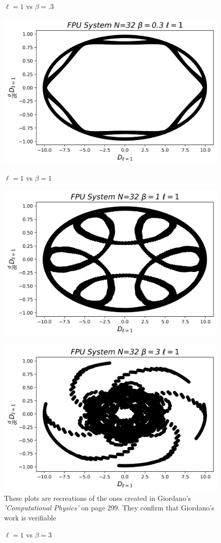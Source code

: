\documentclass[twocolumn]{article}
\begin{document}
\begin{figure}[h]
\caption{$\ell=1$ vs $\beta=.3$}
\includegraphics[scale=.55]{Poincare5aN=1B=003}
\caption{$\ell=1$ vs $\beta=1$}
\includegraphics[scale=.55]{Poincare5aN=1B=1}
\caption{$\ell=1$ vs $\beta=3$}
\includegraphics[scale=.55]{Poincare5aN=1B=3}
\centering
\small{These plots are recreations of the ones created in Giordano's \textit{'Computational Physics'} on page 299. They confirm that Giordano's work is verifiable}
\end{figure}
\end{document}
